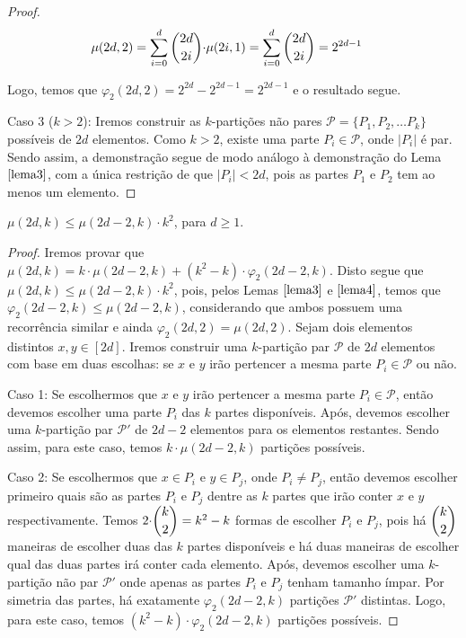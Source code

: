 \documentclass[12pt]{article}
\begin{document}
{\begin{proof}
	\begin{align}
		\begin{split}
			\mu(2d, 2) &= \sum\limits_{i = 0}^{d}\escolhe{2d}{2i} {\cdot} \mu(2i, 1) = \sum\limits_{i = 0}^{d}\escolhe{2d}{2i} = 2^{2d-1}
		\end{split} 
	\end{align} 
	
	Logo, temos que $\varphi_2(2d, 2)  = 2^{2d} - 2^{2d - 1} = 2^{2d - 1}$ e o resultado segue. \newl
	
	
	Caso 3 ($k > 2$): Iremos construir as $k$-partições não pares $\mathcal{P} = \{P_1, P_2, \ldots P_k\}$ possíveis de $2d$ elementos. Como $k > 2$, existe uma parte $P_i \in \mathcal{P}$, onde $|P_i|$ é par. Sendo assim, a demonstração segue de modo análogo à demonstração do Lema $\ref{lema3}$, com a única restrição de que $|P_i| < 2d$, pois as partes $P_1$ e $P_2$ tem ao menos um elemento.
\end{proof} \newl
  

\begin{lema} 
	\label{lema5} 
	$\mu(2d, k) \leq \mu(2d - 2, k) {\cdot} k^{2}$, para $d \geq 1$.
\end{lema}

\begin{proof}
	Iremos provar que $\mu(2d, k) = k {\cdot} \mu(2d - 2, k) + (k^2 - k) {\cdot} \varphi_2(2d - 2, k)$. Disto segue que $\mu(2d, k) \leq \mu(2d - 2, k) {\cdot} k^{2}$, pois, pelos Lemas $\ref{lema3}$ e $\ref{lema4}$, temos que $\varphi_2(2d - 2, k) \leq \mu(2d - 2, k)$, considerando que ambos possuem uma recorrência similar e ainda $\varphi_2(2d, 2) = \mu(2d, 2)$. Sejam dois elementos distintos $x, y \in [2d]$. Iremos construir uma $k$-partição par $\mathcal{P}$ de $2d$ elementos com base em duas escolhas: se $x$ e $y$ irão pertencer a mesma parte $P_i \in \mathcal{P}$ ou não. \newl
	
	Caso 1: Se escolhermos que $x$ e $y$ irão pertencer a mesma parte $P_i \in \mathcal{P}$, então devemos escolher uma parte $P_i$ das $k$ partes disponíveis. Após, devemos escolher uma $k$-partição par $\mathcal{P'}$ de $2d - 2$ elementos para os elementos restantes. Sendo assim, para este caso, temos $k {\cdot} \mu(2d - 2, k)$ partições possíveis. \newl 
	
	Caso 2: Se escolhermos que $x \in P_i$ e $y \in P_j$, onde $P_i \neq P_j$, então devemos escolher primeiro quais são as partes $P_i$ e $P_j$ dentre as $k$ partes que irão conter $x$ e $y$ respectivamente. Temos $2 {\cdot} \escolhe{k}{2} = k^2 - k$ formas de escolher $P_i$ e $P_j$, pois há $\escolhe{k}{2}$ maneiras de escolher duas das $k$ partes disponíveis e há duas maneiras de escolher qual das duas partes irá conter cada elemento. Após, devemos escolher uma $k$-partição não par $\mathcal{P'}$ onde apenas as partes $P_i$ e $P_j$ tenham tamanho ímpar. Por simetria das partes, há exatamente $\varphi_2(2d - 2, k)$ partições $\mathcal{P'}$ distintas. Logo, para este caso, temos $(k^2 - k) {\cdot} \varphi_2(2d - 2, k)$ partições possíveis.
	

\end{proof}}
\end{document}
